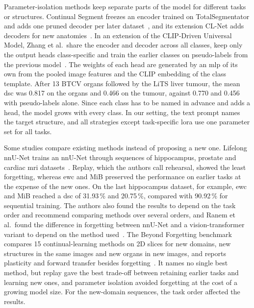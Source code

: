 Parameter-isolation methods keep separate parts of the model for different tasks or structures.
Continual Segment freezes an encoder trained on TotalSegmentator and adds one pruned decoder per later dataset~\cite{ji2023continualsegmentsingleunified}, and its extension CL-Net adds decoders for new anatomies~\cite{guo2025continuallearningdrivenmodelaccurate}.
In an extension of the CLIP-Driven Universal Model, Zhang et al.\ share the encoder and decoder across all classes, keep only the output heads class-specific and train the earlier classes on pseudo-labels from the previous model~\cite{zhang2023continuallearningabdominalmultiorgan,liu2024universalextensible}.
The weights of each head are generated by an \gls{mlp} of its own from the pooled image features and the CLIP embedding of the class template.
After 13 BTCV organs followed by the LiTS liver tumour, the mean \gls{dsc} was 0.817 on the organs and 0.466 on the tumour, against 0.770 and 0.456 with pseudo-labels alone.
Since each class has to be named in advance and adds a head, the model grows with every class.
In our setting, the text prompt names the target structure, and all strategies except task-specific \gls{lora} use one parameter set for all tasks.

Some studies compare existing methods instead of proposing a new one.
Lifelong nnU-Net trains an nnU-Net through sequences of hippocampus, prostate and cardiac \gls{mri} datasets~\cite{gonzalez2023lifelong}.
Replay, which the authors call rehearsal, showed the least forgetting, whereas \gls{ewc} and MiB preserved the performance on earlier tasks at the expense of the new ones.
On the last hippocampus dataset, for example, \gls{ewc} and MiB reached a \gls{dsc} of 31.93\,\% and 20.75\,\%, compared with 90.92\,\% for sequential training.
The authors also found the results to depend on the task order and recommend comparing methods over several orders, and Ranem et al.\ found the difference in forgetting between nnU-Net and a vision-transformer variant to depend on the method used~\cite{ranem2022continualhippocampussegmentationtransformers}.
The Beyond Forgetting benchmark compares 15 continual-learning methods on 2D slices for new domains, new structures in the same images and new organs in new images, and reports plasticity and forward transfer besides forgetting~\cite{wang2026beyondforgetting}.
It names no single best method, but replay gave the best trade-off between retaining earlier tasks and learning new ones, and parameter isolation avoided forgetting at the cost of a growing model size.
For the new-domain sequences, the task order affected the results.

